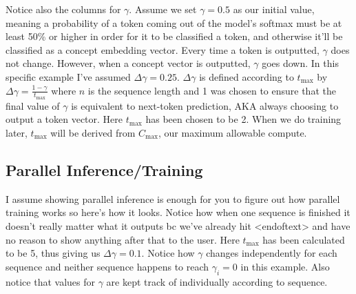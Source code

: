 \documentclass{article}
\begin{document}
Notice also the columns for $\gamma$.
Assume we set $\gamma=0.5$ as our initial value, meaning a probability of a token coming out of the model's softmax must be at least 50\% or higher in order for it to be classified a token, and otherwise it'll be classified as a concept embedding vector.
Every time a token is outputted, $\gamma$ does not change. 
However, when a concept vector is outputted, $\gamma$ goes down. 
In this specific example I've assumed $\Delta \gamma=0.25$.
$\Delta\gamma$ is defined according to $t_\text{max}$ by $\Delta\gamma = \frac{1-\gamma}{t_\text{max}}$ where $n$ is the sequence length and 1 was chosen to ensure that the final value of $\gamma$ is equivalent to next-token prediction, AKA always choosing to output a token vector.
Here $t_\text{max}$ has been chosen to be 2.
When we do training later, $t_\text{max}$ will be derived from $C_\text{max}$, our maximum allowable compute.


\subsection{Parallel Inference/Training}

I assume showing parallel inference is enough for you to figure out how parallel training works so here's how it looks. Notice how when one sequence is finished it doesn't really matter what it outputs bc we've already hit <endoftext> and have no reason to show anything after that to the user. Here $t_\text{max}$ has been calculated to be 5, thus giving us $\Delta\gamma = 0.1$.
Notice how $\gamma$ changes independently for each sequence and neither sequence happens to reach $\gamma_i=0$ in this example. Also notice that values for $\gamma$ are kept track of individually according to sequence.\par
\end{document}
